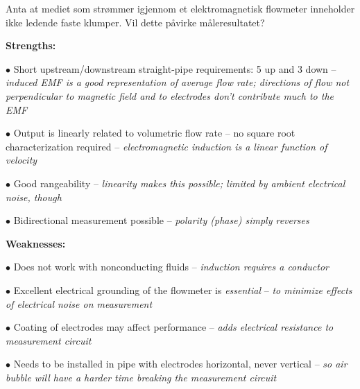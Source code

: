 \vskip 10pt

Anta at mediet som str{\o}mmer igjennom et elektromagnetisk flowmeter inneholder ikke ledende faste klumper. Vil dette p{\aa}virke m{\aa}leresultatet? 

\vskip 10pt














{\bf Strengths:}

\medskip
\item{$\bullet$} Short upstream/downstream straight-pipe requirements: 5 up and 3 down -- {\it induced EMF is a good representation of average flow rate; directions of flow not perpendicular to magnetic field and to electrodes don't contribute much to the EMF}
\item{$\bullet$} Output is linearly related to volumetric flow rate -- no square root characterization required -- {\it electromagnetic induction is a linear function of velocity}
\item{$\bullet$} Good rangeability -- {\it linearity makes this possible; limited by ambient electrical noise, though}
\item{$\bullet$} Bidirectional measurement possible -- {\it polarity (phase) simply reverses}
\medskip

\vskip 10pt

{\bf Weaknesses:}

\medskip
\item{$\bullet$} Does not work with nonconducting fluids -- {\it induction requires a conductor}
\item{$\bullet$} Excellent electrical grounding of the flowmeter is {\it essential} -- {\it to minimize effects of electrical noise on measurement}
\item{$\bullet$} Coating of electrodes may affect performance -- {\it adds electrical resistance to measurement circuit}
\item{$\bullet$} Needs to be installed in pipe with electrodes horizontal, never vertical -- {\it so air bubble will have a harder time breaking the measurement circuit}
\medskip

